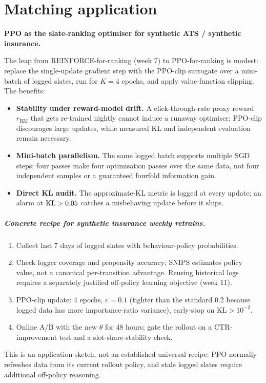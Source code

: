 \documentclass[11pt,oneside]{scrbook}
\begin{document}
\chapter{Matching application}

\begin{matching}
\textbf{PPO as the slate-ranking optimiser for synthetic ATS / synthetic insurance.}

The leap from REINFORCE-for-ranking (week 7) to PPO-for-ranking is modest: replace the single-update gradient step with the PPO-clip surrogate over a mini-batch of logged slates, run for $K=4$ epochs, and apply value-function clipping. The benefits:
\begin{itemize}
  \item \textbf{Stability under reward-model drift.} A click-through-rate proxy reward $r_\text{RM}$ that gets re-trained nightly cannot induce a runaway optimiser; PPO-clip discourages large updates, while measured KL and independent evaluation remain necessary.
  \item \textbf{Mini-batch parallelism.} The same logged batch supports multiple SGD steps; four passes make four optimisation passes over the same data, not
four independent samples or a guaranteed fourfold information gain.
  \item \textbf{Direct KL audit.} The approximate-KL metric is logged at every update; an alarm at $\mathrm{KL} > 0.05$ catches a misbehaving update before it ships.
\end{itemize}

\paragraph{Concrete recipe for synthetic insurance weekly retrains.}
\begin{enumerate}
  \item Collect last 7 days of logged slates with behaviour-policy probabilities.
  \item Check logger coverage and propensity accuracy; SNIPS estimates policy value, not a canonical per-transition advantage. Reusing historical logs requires a separately justified off-policy learning objective (week 11).
  \item PPO-clip update: 4 epochs, $\varepsilon=0.1$ (tighter than the standard 0.2 because logged data has more importance-ratio variance), early-stop on KL$>10^{-2}$.
  \item Online A/B with the new $\theta$ for 48 hours; gate the rollout on a CTR-improvement test and a slot-share-stability check.
\end{enumerate}
This is an application sketch, not an established universal recipe: PPO normally refreshes data from its current rollout policy, and stale logged slates require additional off-policy reasoning.
\end{matching}
\end{document}
